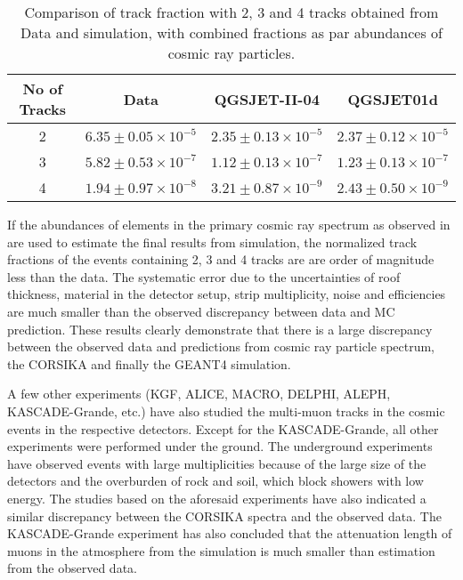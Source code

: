 \begin{table}[btbp]
  \centering
\begin{tabular}{|c|ccc|} \hline
No of Tracks &  Data &   QGSJET-II-04     &  QGSJET01d \\ \hline
    2         & $6.35\pm 0.05\times 10^{-5}$ & $2.35\pm 0.13\times 10^{-5}$ & $2.37\pm 0.12\times 10^{-5}$ \\
    3         & $5.82\pm 0.53\times 10^{-7}$ & $1.12\pm 0.13\times 10^{-7}$ & $1.23\pm 0.13\times 10^{-7}$ \\
    4         & $1.94\pm 0.97\times 10^{-8}$ & $3.21\pm 0.87\times 10^{-9}$ & $2.43\pm 0.50\times 10^{-9}$ \\ \hline
\end{tabular}
\caption{Comparison of track fraction with 2, 3 and 4 tracks
  obtained from Data and simulation, with combined fractions
  as par abundances of cosmic ray particles.}\label{tab:ratio2}
\end{table}


If the abundances of elements in the primary cosmic ray spectrum as
observed in \cite{cosmic1,pdgspectra1} are used to estimate the final
results from simulation, the normalized track fractions of the events
containing 2, 3 and 4 tracks are are order of magnitude less than
the data. The systematic error due to the uncertainties of roof
thickness, material in the detector setup, strip multiplicity, noise
and efficiencies are much smaller than the observed discrepancy
between data and MC prediction. These results clearly demonstrate
that there is a large discrepancy between the observed data and 
predictions from cosmic ray particle spectrum, the CORSIKA and
finally the GEANT4 simulation.

A few other experiments (KGF\cite{kgf1}, ALICE\cite{alice1},
MACRO\cite{macro1}, DELPHI\cite{delphi1}, ALEPH\cite{aleph1},
KASCADE-Grande\cite{kascade1}, etc.) have also studied the multi-muon
tracks in the cosmic events in the respective detectors. Except for
the KASCADE-Grande, all other experiments were performed under
the ground. The underground experiments have observed events with
large multiplicities because of the large size of the detectors and
the overburden of rock and soil, which block showers with low energy.
The studies based on the aforesaid experiments have also indicated
a similar discrepancy between the CORSIKA spectra and the observed
data. The KASCADE-Grande experiment has also concluded that the
attenuation length of muons in the atmosphere from the simulation
is much smaller than estimation from the observed data.

